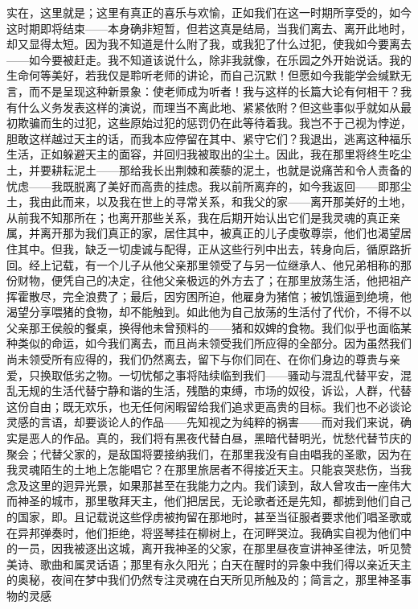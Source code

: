 实在，这里就是；这里有真正的喜乐与欢愉，正如我们在这一时期所享受的，如今这时期即将结束——本身确非短暂，但若这真是结局，当我们离去、离开此地时，却又显得太短。因为我不知道是什么附了我，或我犯了什么过犯，使我如今要离去——如今要被赶走。我不知道该说什么，除非我就像，在乐园之外开始说话。我的生命何等美好，若我仅是聆听老师的讲论，而自己沉默！但愿如今我能学会缄默无言，而不是呈现这种新景象：使老师成为听者！我与这样的长篇大论有何相干？我有什么义务发表这样的演说，而理当不离此地、紧紧依附？但这些事似乎就如从最初欺骗而生的过犯，这些原始过犯的惩罚仍在此等待着我。我岂不于己视为悖逆，胆敢这样越过天主的话，而我本应停留在其中、紧守它们？我退出，逃离这种福乐生活，正如躲避天主的面容，并回归我被取出的尘土。因此，我在那里将终生吃尘土，并要耕耘泥土——那给我长出荆棘和蒺藜的泥土，也就是说痛苦和令人责备的忧虑——我既脱离了美好而高贵的挂虑。我以前所离弃的，如今我返回——即那尘土，我由此而来，以及我在世上的寻常关系，和我父的家——离开那美好的土地，从前我不知那所在；也离开那些关系，我在后期开始认出它们是我灵魂的真正亲属，并离开那为我们真正的家，居住其中，被真正的儿子虔敬尊崇，他们也渴望居住其中。但我，缺乏一切虔诚与配得，正从这些行列中出去，转身向后，循原路折回。经上记载，有一个儿子从他父亲那里领受了与另一位继承人、他兄弟相称的那份财物，便凭自己的决定，往他父亲极远的外方去了；在那里放荡生活，他把祖产挥霍散尽，完全浪费了；最后，因穷困所迫，他雇身为猪倌；被饥饿逼到绝境，他渴望分享喂猪的食物，却不能触到。如此他为自己放荡的生活付了代价，不得不以父亲那王侯般的餐桌，换得他未曾预料的——猪和奴婢的食物。我们似乎也面临某种类似的命运，如今我们离去，而且尚未领受我们所应得的全部分。因为虽然我们尚未领受所有应得的，我们仍然离去，留下与你们同在、在你们身边的尊贵与亲爱，只换取低劣之物。一切忧郁之事将陆续临到我们——骚动与混乱代替平安，混乱无规的生活代替宁静和谐的生活，残酷的束缚，市场的奴役，诉讼，人群，代替这份自由；既无欢乐，也无任何闲暇留给我们追求更高贵的目标。我们也不必谈论灵感的言语，却要谈论人的作品——先知视之为纯粹的祸害——而对我们来说，确实是恶人的作品。真的，我们将有黑夜代替白昼，黑暗代替明光，忧愁代替节庆的聚会；代替父家的，是敌国将要接纳我们，在那里我没有自由唱我的圣歌，因为在我灵魂陌生的土地上怎能唱它？在那里旅居者不得接近天主。只能哀哭悲伤，当我念及这里的迥异光景，如果那甚至在我能力之内。我们读到，敌人曾攻击一座伟大而神圣的城市，那里敬拜天主，他们把居民，无论歌者还是先知，都掳到他们自己的国家，即。且记载说这些俘虏被拘留在那地时，甚至当征服者要求他们唱圣歌或在异邦弹奏时，他们拒绝，将竖琴挂在柳树上，在河畔哭泣。我确实自视为他们中的一员，因我被逐出这城，离开我神圣的父家，在那里昼夜宣讲神圣律法，听见赞美诗、歌曲和属灵话语；那里有永久阳光；白天在醒时的异象中我们得以亲近天主的奥秘，夜间在梦中我们仍然专注灵魂在白天所见所触及的；简言之，那里神圣事物的灵感
